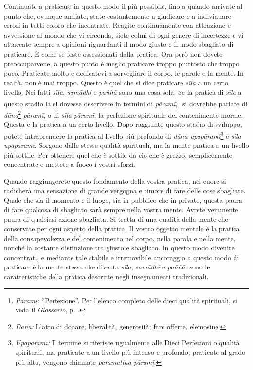 Continuate a praticare in questo modo il più possibile, fino a quando
arrivate al punto che, ovunque andiate, state costantemente a giudicare
e a individuare errori in tutti coloro che incontrate. Reagite
continuamente con attrazione e avversione al mondo che vi circonda,
siete colmi di ogni genere di incertezze e vi attaccate sempre a
opinioni riguardanti il modo giusto e il modo sbagliato di praticare. È
come se foste ossessionati dalla pratica. Ora però non dovete
preoccuparvene, a questo punto è meglio praticare troppo piuttosto che
troppo poco. Praticate molto e dedicatevi a sorvegliare il corpo, le
parole e la mente. In realtà, non è mai troppo. Questo è quel che si
dice praticare \emph{sīla} a un certo livello. Nei fatti \emph{sīla},
\emph{samādhi} e \emph{paññā} sono una cosa sola. Se la pratica di
\emph{sīla} a questo stadio la si dovesse descrivere in termini di
\emph{pāramī},\footnote{\emph{Pāramī:} ``Perfezione''. Per l'elenco
  completo delle dieci qualità spirituali, si veda il \emph{Glossario}, p. \pageref{glossary-parami}.}
si dovrebbe parlare di \emph{dāna}\footnote{\emph{Dāna:} L'atto di
  donare, liberalità, generosità; fare offerte, elemosine.}
\emph{pāramī}, o di \emph{sīla pāramī}, la perfezione spirituale del
contenimento morale. Questa è la pratica a un certo livello. Dopo
raggiunto questo stadio di sviluppo, potete intraprendere la pratica al
livello più profondo di \emph{dāna upapāramī}\footnote{\emph{Upapāramī:}
  Il termine si riferisce ugualmente alle Dieci Perfezioni o qualità
  spirituali, ma praticate a un livello più intenso e profondo;
  praticate al grado più alto, vengono chiamate \emph{paramattha
  pāramī}.} e \emph{sīla upapāramī}. Sorgono dalle stesse qualità
spirituali, ma la mente pratica a un livello più sottile. Per ottenere
quel che è sottile da ciò che è grezzo, semplicemente concentrate e
mettete a fuoco i vostri sforzi.

Quando raggiungerete questo fondamento della vostra pratica, nel cuore
si radicherà una sensazione di grande vergogna e timore di fare delle
cose sbagliate. Quale che sia il momento e il luogo, sia in pubblico che
in privato, questa paura di fare qualcosa di sbagliato sarà sempre nella
vostra mente. Avrete veramente paura di qualsiasi azione sbagliata. Si
tratta di una qualità della mente che conservate per ogni aspetto della
pratica. Il vostro oggetto mentale è la pratica della consapevolezza e
del contenimento nel corpo, nella parola e nella mente, nonché la
costante distinzione tra giusto e sbagliato. In questo modo divenite
concentrati, e mediante tale stabile e irremovibile ancoraggio a questo
modo di praticare è la mente stessa che diventa \emph{sīla},
\emph{samādhi} e \emph{paññā:} sono le caratteristiche della pratica
descritte negli insegnamenti tradizionali.

